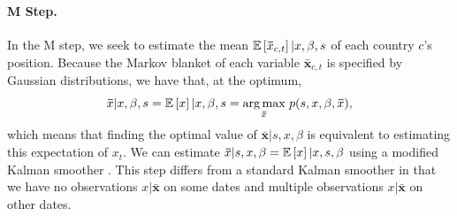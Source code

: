 

\paragraph{M Step.} In the M step, we seek to estimate the mean
$\mathbb{E}\left[\bm \bar x_{c,t}\right] | x, \beta, s$ of each country $c$'s
position.  Because the Markov blanket of each variable $\bm \bar
x_{c,t}$ is specified by Gaussian distributions, we have that, at the
optimum,
\begin{align}
\bm \bar x | x, \beta, s = \mathbb{E}\left[x\right] | x, \beta, s
  = \underset{\bm \bar x} { \arg \max }\hspace{3pt} p(s, x, \beta, \bm \bar x),
\end{align}
which means that finding the optimal value of $\bm \bar x | s, x,
\beta$ is equivalent to estimating this expectation of $x_t$.  We can
estimate $\bm \bar x | s, x, \beta = \mathbb{E}\left[x\right] | x, s, \beta$ using a
modified Kalman smoother \cite{kalman:1960}.  This step differs from a
standard Kalman smoother in that we have no observations $x | \bm \bar
x$ on some dates and multiple observations $x | \bm \bar x$ on other
dates.

